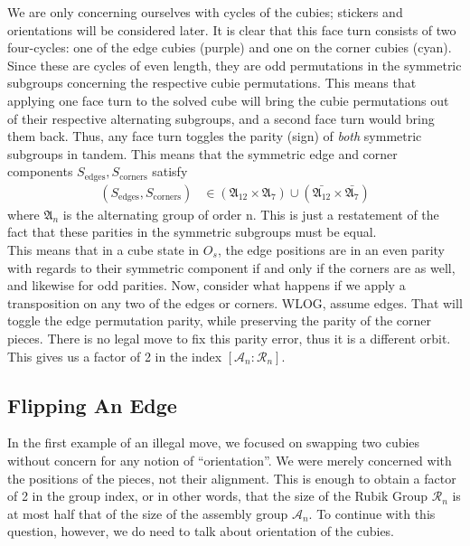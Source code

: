 \documentclass[10pt,letterpaper]{report}
\begin{document}
We are only concerning ourselves with cycles of the cubies; stickers and orientations will be considered later.  It is clear that this face turn consists of two four-cycles: one of the edge cubies (purple) and one on the corner cubies (cyan).  Since these are cycles of even length, they are odd permutations in the symmetric subgroups concerning the respective cubie permutations.  This means that applying one face turn to the solved cube will bring the cubie permutations out of their respective alternating subgroups, and a second face turn would bring them back.  Thus, any face turn toggles the parity (sign) of \textit{both} symmetric subgroups in tandem.  This means that the symmetric edge and corner components $S_{\text{edges}}, S_{\text{corners}}$ satisfy
\begin{align*}
(S_{\text{edges}},S_{\text{corners}})
&\in
(\mathfrak{A}_{12} \times \mathfrak{A}_7)
\cup
(\bar{\mathfrak{A}_{12}} \times \bar{\mathfrak{A}_7})
\end{align*}
where $\mathfrak{A}_n$ is the alternating group of order n.  This is just a restatement of the fact that these parities in the symmetric subgroups must be equal. \\

This means that in a cube state in $O_s$, the edge positions are in an even parity with regards to their symmetric component if and only if the corners are as well, and likewise for odd parities.  Now, consider what happens if we apply a transposition on any two of the edges or corners.  WLOG, assume edges.  That will toggle the edge permutation parity, while preserving the parity of the corner pieces.  There is no legal move to fix this parity error, thus it is a different orbit.  This gives us a factor of 2 in the index $[\mathcal{A}_n : \mathcal{R}_n]$.

\subsection{Flipping An Edge}

In the first example of an illegal move, we focused on swapping two cubies without concern for any notion of ``orientation''.  We were merely concerned with the positions of the pieces, not their alignment.  This is enough to obtain a factor of 2 in the group index, or in other words, that the size of the Rubik Group $\mathcal{R}_n$ is at most half that of the size of the assembly group $\mathcal{A}_n$.  To continue with this question, however, we do need to talk about orientation of the cubies. \\
\end{document}
